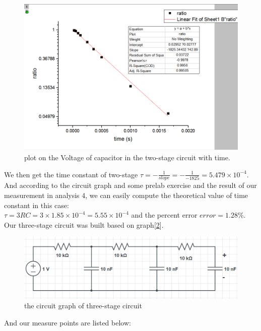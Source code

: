 \begin{figure}[htbp]
	\centering %
	\includegraphics[width=\linewidth]{images/2_6.PNG} %
	\caption{plot on the Voltage of capacitor in the two-stage circuit with time.} %
	\label{fig:2.6} %
\end{figure}
\phantom{ } We then get the time constant of two-stage 
$\tau = -\frac{1}{slope} = -\frac{1}{-1825} = 5.479\times10^{-4} $.\\ And according to the circuit graph and some prelab exercise and the result of our measurement in analysis 4, we can easily compute
the theoretical value of time constant in this case:\\
$\tau = 3RC = 3\times1.85\times10^{-4} = 5.55\times10^{-4}$ and the percent error $error = 1.28\%$.\\
\phantom{ } Our three-stage circuit was built based on graph[\ref{fig:2.4}].\\
\begin{figure}[htbp]
	\centering %
	\includegraphics[width=\linewidth]{images/2_4.PNG} %
	\caption{the circuit graph of three-stage circuit} %
	\label{fig:2.4} %
\end{figure}
\phantom{ } And our measure points are listed below:\\
